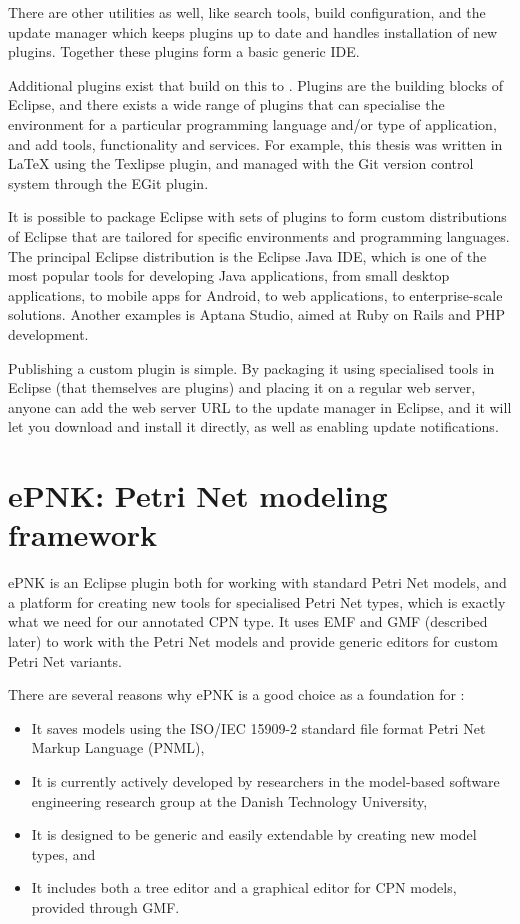 There are other utilities as well, like search tools, build configuration, and
the update manager which keeps plugins up to date and handles installation of
new plugins. Together these plugins form a basic generic IDE.

Additional plugins exist that build on this to . Plugins are the building blocks
of Eclipse, and there exists a wide range of plugins that can specialise the
environment for a particular programming language and/or type of application,
and add tools, functionality and services. For example, this thesis was written
in \LaTeX{} using the Texlipse plugin, and managed with the Git version
control system through the EGit plugin.

It is possible to package Eclipse with sets of plugins to form custom
distributions of Eclipse that are tailored for specific environments and
programming languages. The principal Eclipse distribution is the Eclipse Java
IDE, which is one of the most popular tools for developing Java applications,
from small desktop applications, to mobile apps for Android, to web
applications, to enterprise-scale solutions. Another examples is Aptana Studio,
aimed at Ruby on Rails and PHP development. 

Publishing a custom plugin is simple. By packaging it using specialised tools
in Eclipse (that themselves are plugins) and placing it on a regular web
server, anyone can add the web server URL to the update manager in Eclipse, and
it will let you download and install it directly, as well as enabling update
notifications.


\section{ePNK: Petri Net modeling framework}
\label{sec:epnk}
ePNK is an Eclipse plugin both for working with standard Petri Net models, and a
platform for creating new tools for specialised Petri Net types, which is
exactly what we need for our annotated CPN type. It uses EMF and GMF
(described later) to work with the Petri Net models and provide generic
editors for custom Petri Net variants.

There are several reasons why ePNK is a good choice as a foundation for \thename{}:
\begin{itemize}
	\item It saves models using the ISO/IEC 15909-2 \cite{ISO-15909-2} standard
	file format Petri Net Markup Language (PNML),
	\item It is currently actively developed by researchers in the model-based
	software engineering research group at the Danish Technology University,
	\item It is designed to be generic and easily extendable by creating new model
	types, and
	\item It includes both a tree editor and a graphical editor for CPN models,
	provided through GMF.
\end{itemize}

